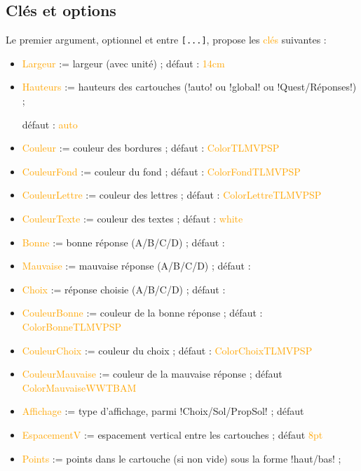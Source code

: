\documentclass[french,a4paper,11pt]{article}
\newcommand\Cle[1]{{\small\sffamily\textlangle \textcolor{orange}{#1}\textrangle}}
\newcommand\cmaj[1]{\tcbox[vignetteMaJ]{#1}\xspace}
\begin{document}
\subsection{Clés et options}

\begin{tipblock}
Le premier argument, optionnel et entre \texttt{[...]}, propose les \Cle{clés} suivantes :

\begin{itemize}
	\item \Cle{Largeur} := largeur (avec unité) ; \hfill{}défaut : \Cle{14cm}
%	
	\item \Cle{Hauteurs} := hauteurs des cartouches (\motcletex!auto! ou \motcletex!global! ou \motcletex!Quest/Réponses!) ;
	
	\hfill{}défaut : \Cle{auto}
	\item \Cle{Couleur} := couleur des bordures ; \hfill{}défaut : \Cle{ColorTLMVPSP}
	\item \Cle{CouleurFond} := couleur du fond ; \hfill{}défaut : \Cle{ColorFondTLMVPSP}
	\item \Cle{CouleurLettre} := couleur des lettres ; \hfill{}défaut : \Cle{ColorLettreTLMVPSP}
	\item \Cle{CouleurTexte} := couleur des textes ; \hfill{}défaut : \Cle{white}
	\item \Cle{Bonne} := bonne réponse (A/B/C/D) ; \hfill{}défaut : \Cle{}
	\item \Cle{Mauvaise} := mauvaise réponse (A/B/C/D) ; \hfill{}défaut : \Cle{}
	\item \Cle{Choix} := réponse choisie (A/B/C/D) ; \hfill{}défaut : \Cle{}
	\item \Cle{CouleurBonne} := couleur de la bonne réponse ; \hfill{}défaut : \Cle{ColorBonneTLMVPSP}
	\item \Cle{CouleurChoix} := couleur du choix ; \hfill{}défaut : \Cle{ColorChoixTLMVPSP}
	\item \Cle{CouleurMauvaise} := couleur de la mauvaise réponse ; \hfill{}défaut \Cle{ColorMauvaiseWWTBAM}
	\item \Cle{Affichage} := type d'affichage, parmi \motcletex!Choix/Sol/PropSol! ; \hfill{}défaut \Cle{}
	\item \Cle{EspacementV} := espacement vertical entre les cartouches ; \hfill{}défaut \Cle{8pt}
	\item \cmaj{0.1.1} \Cle{Points} := points dans le cartouche (si non vide) sous la forme \motcletex!haut/bas! ;
	

\end{itemize}
\end{tipblock}
\end{document}
